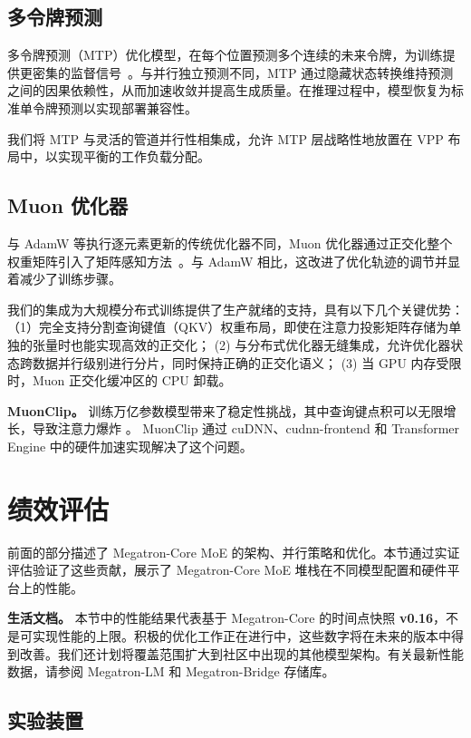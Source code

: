 \documentclass[10pt,logo,copyright]{nvidiatechreport_zh}
\begin{document}
\subsection{多令牌预测}
多令牌预测（MTP）优化模型，在每个位置预测多个连续的未来令牌，为训练提供更密集的监督信号~\cite{gloeckle2024better,deepseekai2025deepseekv3technicalreport}。与并行独立预测不同，MTP 通过隐藏状态转换维持预测之间的因果依赖性，从而加速收敛并提高生成质量。在推理过程中，模型恢复为标准单令牌预测以实现部署兼容性。

我们将 MTP 与灵活的管道并行性相集成，允许 MTP 层战略性地放置在 VPP 布局中，以实现平衡的工作负载分配。

\subsection{Muon 优化器}
与 AdamW 等执行逐元素更新的传统优化器不同，Muon 优化器通过正交化整个权重矩阵引入了矩阵感知方法~\cite{liu2025muonscalablellmtraining}。与 AdamW 相比，这改进了优化轨迹的调节并显着减少了训练步骤。

我们的集成为大规模分布式训练提供了生产就绪的支持，具有以下几个关键优势：（1）完全支持分割查询键值（QKV）权重布局，即使在注意力投影矩阵存储为单独的张量时也能实现高效的正交化； (2) 与分布式优化器无缝集成，允许优化器状态跨数据并行级别进行分片，同时保持正确的正交化语义； (3) 当 GPU 内存受限时，Muon 正交化缓冲区的 CPU 卸载。

\textbf{MuonClip。}
训练万亿参数模型带来了稳定性挑战，其中查询键点积可以无限增长，导致注意力爆炸 \cite{kimik2}。 MuonClip 通过 cuDNN、cudnn-frontend 和 Transformer Engine 中的硬件加速实现解决了这个问题。

\section{绩效评估}\label{performance-evaluations}
前面的部分描述了 Megatron-Core MoE 的架构、并行策略和优化。本节通过实证评估验证了这些贡献，展示了 Megatron-Core MoE 堆栈在不同模型配置和硬件平台上的性能。

\begin{notebox}
\textbf{生活文档。} 本节中的性能结果代表基于 Megatron-Core 的时间点快照 \textbf{v0.16}，不是可实现性能的上限。积极的优化工作正在进行中，这些数字将在未来的版本中得到改善。我们还计划将覆盖范围扩大到社区中出现的其他模型架构。有关最新性能数据，请参阅 Megatron-LM 和 Megatron-Bridge 存储库。
\end{notebox}

\subsection{实验装置}
\end{document}
